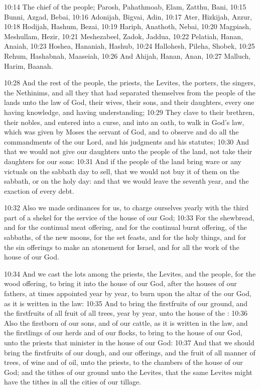 10:14 The chief of the people; Parosh, Pahathmoab, Elam, Zatthu, Bani,
10:15 Bunni, Azgad, Bebai, 10:16 Adonijah, Bigvai, Adin, 10:17 Ater,
Hizkijah, Azzur, 10:18 Hodijah, Hashum, Bezai, 10:19 Hariph, Anathoth,
Nebai, 10:20 Magpiash, Meshullam, Hezir, 10:21 Meshezabeel, Zadok,
Jaddua, 10:22 Pelatiah, Hanan, Anaiah, 10:23 Hoshea, Hananiah, Hashub,
10:24 Hallohesh, Pileha, Shobek, 10:25 Rehum, Hashabnah, Maaseiah,
10:26 And Ahijah, Hanan, Anan, 10:27 Malluch, Harim, Baanah.

10:28 And the rest of the people, the priests, the Levites, the
porters, the singers, the Nethinims, and all they that had separated
themselves from the people of the lands unto the law of God, their
wives, their sons, and their daughters, every one having knowledge,
and having understanding; 10:29 They clave to their brethren, their
nobles, and entered into a curse, and into an oath, to walk in God's
law, which was given by Moses the servant of God, and to observe and
do all the commandments of the \LORD our Lord, and his judgments and
his statutes; 10:30 And that we would not give our daughters unto the
people of the land, not take their daughters for our sons: 10:31 And
if the people of the land bring ware or any victuals on the sabbath
day to sell, that we would not buy it of them on the sabbath, or on
the holy day: and that we would leave the seventh year, and the
exaction of every debt.

10:32 Also we made ordinances for us, to charge ourselves yearly with
the third part of a shekel for the service of the house of our God;
10:33 For the shewbread, and for the continual meat offering, and for
the continual burnt offering, of the sabbaths, of the new moons, for
the set feasts, and for the holy things, and for the sin offerings to
make an atonement for Israel, and for all the work of the house of our
God.

10:34 And we cast the lots among the priests, the Levites, and the
people, for the wood offering, to bring it into the house of our God,
after the houses of our fathers, at times appointed year by year, to
burn upon the altar of the \LORD our God, as it is written in the law:
10:35 And to bring the firstfruits of our ground, and the firstfruits
of all fruit of all trees, year by year, unto the house of the \LORD:
10:36 Also the firstborn of our sons, and of our cattle, as it is
written in the law, and the firstlings of our herds and of our flocks,
to bring to the house of our God, unto the priests that minister in
the house of our God: 10:37 And that we should bring the firstfruits
of our dough, and our offerings, and the fruit of all manner of trees,
of wine and of oil, unto the priests, to the chambers of the house of
our God; and the tithes of our ground unto the Levites, that the same
Levites might have the tithes in all the cities of our tillage.

